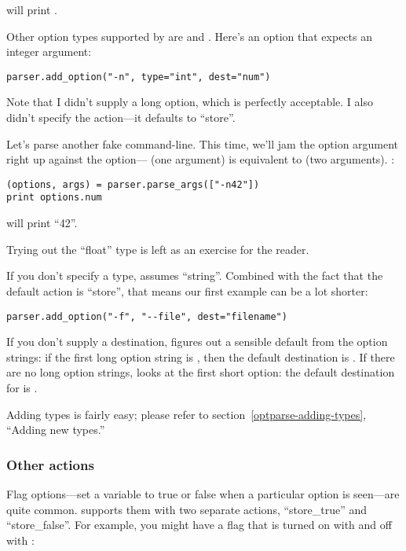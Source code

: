 will print .

Other option types supported by  are  and
.  Here's an option that expects an integer argument:

\begin{verbatim}
parser.add_option("-n", type="int", dest="num")
\end{verbatim}

Note that I didn't supply a long option, which is perfectly acceptable.
I also didn't specify the action---it defaults to ``store''.
  
Let's parse another fake command-line.  This time, we'll jam the
option argument right up against the option--- (one
argument) is equivalent to  (two arguments). :

\begin{verbatim}
(options, args) = parser.parse_args(["-n42"])
print options.num
\end{verbatim}

will print ``42''.

Trying out the ``float'' type is left as an exercise for the reader.

If you don't specify a type,  assumes ``string''.
Combined with the fact that the default action is ``store'', that
means our first example can be a lot shorter:

\begin{verbatim}
parser.add_option("-f", "--file", dest="filename")
\end{verbatim}

If you don't supply a destination,  figures out a
sensible default from the option strings: if the first long option
string is , then the default destination is
.  If there are no long option strings,
 looks at the first short option: the default
destination for  is .

Adding types is fairly easy; please refer to
section~\ref{optparse-adding-types}, ``Adding new types.''

\subsubsection{Other  actions\label{optparse-other-store-actions}}

Flag options---set a variable to true or false when a particular
option is seen---are quite common.   supports them
with two separate actions, ``store_true'' and ``store_false''.  For
example, you might have a  flag that is turned on with
 and off with :

